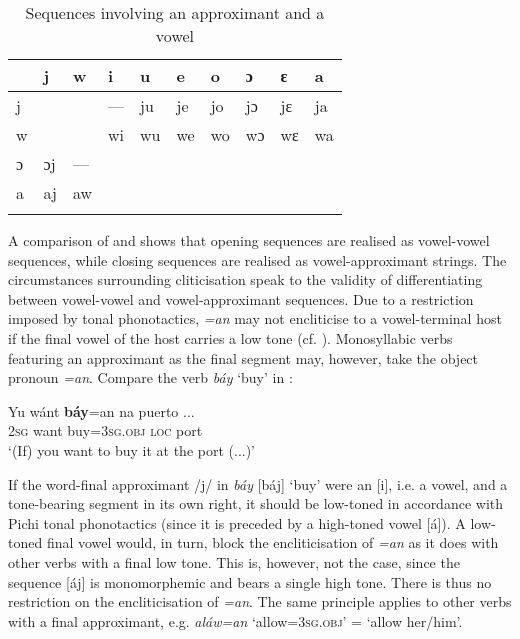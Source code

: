 \begin{table}
\caption{Sequences involving an approximant and a vowel}
\label{tab:key:2.10}

\begin{tabularx}{\textwidth}{XXXXXXXXXX}
\lsptoprule
 & j & w & i & u & e & o & ɔ & ɛ & a\\
\midrule 
j &  &  & {}--- & ju & je & jo & jɔ & jɛ & ja\\
w &  &  & wi & wu & we & wo & wɔ & wɛ & wa\\
ɔ & ɔj & {}--- &  &  &  &  &  &  & \\
a & aj & aw &  &  &  &  &  &  & \\
\lspbottomrule
\end{tabularx}
\end{table}
A comparison of  and  shows that opening sequences are realised as vowel-vowel sequences, while closing sequences are realised as vowel-approximant strings. The circumstances surrounding cliticisation speak to the validity of differentiating between vowel-vowel and vowel-approximant sequences. Due to a restriction imposed by tonal phonotactics, \textit{=an} may not encliticise to a vowel-terminal host if the final vowel of the host carries a low tone (cf. ). Monosyllabic verbs featuring an approximant as the final segment may, however, take the object pronoun \textit{=an}. Compare the verb \textit{báy} ‘buy’ in : 

\ea%
    \label{ex:key:41}
    \gll   Yu  wánt  \textbf{báy}=an    na  puerto  \op...\cp\\
\textsc{2sg}  want  buy=\textsc{3sg.obj}  \textsc{loc}  port\\
\glt  ‘(If) you want to buy it at the port (...)’
\z

If the word-final approximant /j/ in \textit{báy} [báj] ‘buy’ were an [i], i.e. a vowel, and a tone-bearing segment in its own right, it should be low-toned in accordance with Pichi tonal phonotactics (since it is preceded by a high-toned vowel [á]). A low-toned final vowel would, in turn, block the encliticisation of \textit{=an} as it does with other verbs with a final low tone. This is, however, not the case, since the sequence [áj] is monomorphemic and bears a single high tone. There is thus no restriction on the encliticisation of \textit{=an}. The same principle applies to other verbs with a final approximant, e.g. \textit{aláw=an} ‘allow=\textsc{3sg.obj}’ = ‘allow her/him’.


